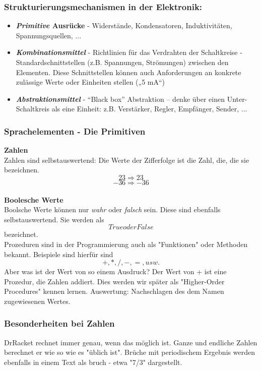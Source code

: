 \subsubsection{Strukturierungsmechanismen in der Elektronik:}
\begin{itemize}
	\item \textbf{\textit{Primitive} Ausrücke}
		\subitem - Widerstände, Kondensatoren, Induktivitäten, Spannungsquellen, ...

	\item \textbf{\textit{Kombinationsmittel}}
		\subitem - Richtlinien für das Verdrahten der Schaltkreise
		\subitem - Standardschnittstellen (z.B. Spannungen, Strömungen) zwischen den
		Elementen. Diese Schnittstellen können auch Anforderungen an
		konkrete zulässige Werte oder Einheiten stellen („5 mA“)

	\item \textbf{\textit{Abstraktionsmittel}}
		\subitem - 	“Black box” Abstraktion – denke über einen Unter-Schaltkreis als eine
		Einheit: z.B. Verstärker, Regler, Empfänger, Sender, ...
\end{itemize}

\subsubsection{Sprachelementen - Die Primitiven}
\textbf{Zahlen} \\
Zahlen sind selbstauswertend: Die Werte der Zifferfolge ist die Zahl,
die, die sie bezeichnen.
$$ 23 \Rightarrow 23 $$
$$ -36 \Rightarrow -36 $$
\\

\textbf{Boolesche Werte} \\
Boolsche Werte können nur \textit{wahr} oder \textit{falsch} sein. Diese sind ebenfalls
selbstauswertend. Sie werden als $$True oder False$$ bezeichnet.\\


Prozeduren sind in der Programmierung auch als "Funktionen" oder Methoden bekannt. Beispiele sind hierfür sind
$$ +, *, /, -, =, usw.$$
Aber was ist der Wert von so einem Ausdruck? Der Wert von + ist eine Prozedur, die Zahlen addiert.
Dies werden wir später als "Higher-Order Procedures" kennen lernen.
Auswertung: Nachschlagen des dem Namen zugewiesenen Wertes.

\subsubsection{Besonderheiten bei Zahlen}
DrRacket rechnet immer genau, wenn das möglich ist. Ganze und endliche Zahlen berechnet er wie so wie es
"üblich ist".
Brüche mit periodischem Ergebnis werden ebenfalls in einem Text als bruch - etwa "7/3" dargestellt.

